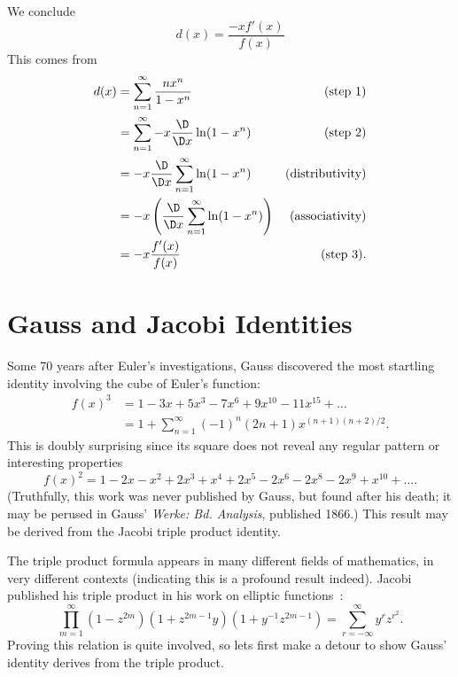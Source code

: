 \documentclass{article}
\begin{document}
 We conclude
\begin{equation}
  d(x) = \frac{-xf'(x)}{f(x)}
\end{equation}
This comes from
\begin{align*}
d(x) &= \sum^{\infty}_{n=1}\frac{nx^{n}}{1 - x^{n}}&\mbox{(step 1)}\\
&= \sum^{\infty}_{n=1}-x\frac{\D}{\D x}\ln(1 - x^{n})&\mbox{(step 2)}\\
&= -x\frac{\D}{\D x}\sum^{\infty}_{n=1}\ln(1 - x^{n})&\mbox{(distributivity)}\\
&= -x\left(\frac{\D}{\D x}\sum^{\infty}_{n=1}\ln(1 - x^{n})\right)&\mbox{(associativity)}\\
&= -x\frac{f'(x)}{f(x)}&\mbox{(step 3)}.
\end{align*}

\section{Gauss and Jacobi Identities}

Some 70 years after Euler's investigations, Gauss discovered the most
startling identity involving the cube of Euler's function:
\begin{equation}
  \begin{split}
f(x)^{3} &= 1 - 3x + 5x^{3} - 7x^{6} + 9x^{10} - 11x^{15} + \dots\\
    &= 1 + \sum^{\infty}_{n=1} (-1)^{n}(2n+1)x^{(n+1)(n+2)/2}.
  \end{split}
\end{equation}
This is doubly surprising since its square does not reveal any regular
pattern or interesting properties
\begin{equation}
  f(x)^{2} = 1 - 2x - x^{2} + 2x^{3} + x^{4} + 2x^{5} - 2x^{6} - 2x^{8}
  - 2x^{9} + x^{10} + \dots.
\end{equation}
(Truthfully, this work was never published by Gauss, but found after his
death; it may be perused in Gauss' \emph{Werke: Bd. Analysis}, published 1866.)
This result may be derived from the Jacobi triple product identity.

The triple product formula appears in many different fields of
mathematics, in very different contexts (indicating this is a profound
result indeed). Jacobi published his triple product in his work on
elliptic functions~\cite{jacobi}:
\begin{equation}
  \prod^{\infty}_{m=1}
  (1 - z^{2m})
  (1 + z^{2m-1}y)
  (1 + y^{-1}z^{2m-1}) = \sum_{r=-\infty}^{\infty} y^{r}z^{r^{2}}.
\end{equation}
Proving this relation is quite involved, so lets first make a detour to
show Gauss' identity derives from the triple product.
\end{document}
